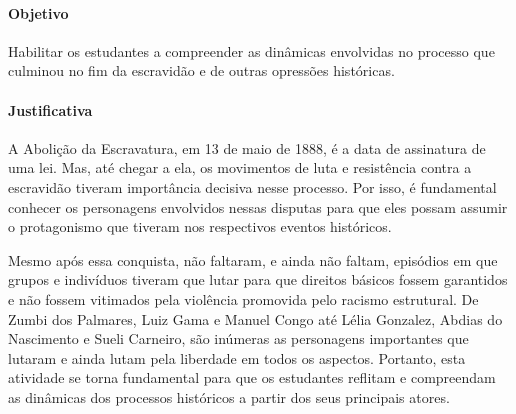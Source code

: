 \documentclass[12pt]{extarticle}
\begin{document}
\paragraph{Objetivo} Habilitar os estudantes a compreender as dinâmicas
envolvidas no processo que culminou no fim da escravidão e de outras
opressões históricas.


\paragraph{Justificativa} A Abolição da Escravatura, em 13 de maio de
1888, é a data de assinatura de uma lei. Mas, até chegar a ela, os
movimentos de luta e resistência contra a escravidão tiveram importância
decisiva nesse processo. Por isso, é fundamental conhecer os personagens
envolvidos nessas disputas para que eles possam assumir o protagonismo
que tiveram nos respectivos eventos históricos.

Mesmo após essa conquista, não faltaram, e ainda não faltam, episódios
em que grupos e indivíduos tiveram que lutar para que direitos básicos
fossem garantidos e não fossem vitimados pela violência promovida pelo
racismo estrutural. De Zumbi dos Palmares, Luiz Gama e Manuel Congo até
Lélia Gonzalez, Abdias do Nascimento e Sueli Carneiro, são inúmeras as
personagens importantes que lutaram e ainda lutam pela liberdade em
todos os aspectos. Portanto, esta atividade se torna fundamental para
que os estudantes reflitam e compreendam as dinâmicas dos processos
históricos a partir dos seus principais atores.


\end{document}
